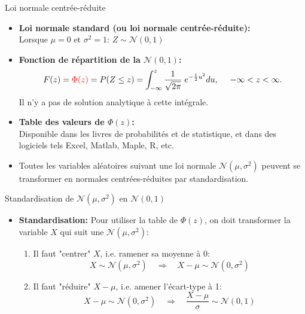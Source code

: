 \documentclass{BeamerTemplate}
\begin{document}
\begin{frame}[t]{Loi normale centrée-réduite}
\small
\begin{itemize}\itemsep5mm
\item {\bf Loi normale standard (ou loi normale centrée-réduite):}\\ Lorsque $\mu=0$ et $\sigma^2=1$:  \alert{$Z\sim \mathcal{N}(0,1)$}
\item {\bf Fonction de répartition de la $\mathcal{N}(0,1)$:}
$$F(z)={\color{red}{\Phi(z)}}=P(Z\leq z)%
=\int_{-\infty}^z\frac{1}{\sqrt{2\pi}}\;e^{-\frac{1}{2}u^2}du,\quad\ -\infty<z<\infty.$$
Il n'y a pas de solution analytique à cette intégrale.

\item{\bf Table des valeurs de $\Phi(z)$:}  \\
Disponible dans les livres de probabilités et de statistique, et dans des logiciels tels Excel, Matlab, Maple, R, etc.
\item Toutes les variables aléatoires suivant une loi normale $\mathcal{N}(\mu,\sigma^2)$ peuvent se transformer en normales centrées-réduites par standardisation.  \\

\end{itemize}
\end{frame}

\begin{frame}[t]{Standardisation de $\mathcal{N}(\mu, \sigma^2)$ en $\mathcal{N}(0,1)$}
\begin{itemize}
\item {\bf Standardisation:} Pour utiliser la table de $\Phi(z)$, on doit transformer la variable $X$ qui suit une $\mathcal{N}(\mu,\sigma^2)$:

\bigskip
    \begin{enumerate}
    \item Il faut  "centrer" $X$, i.e. ramener sa moyenne à 0:
    $$X\sim \mathcal{N}(\mu,\sigma^2)\quad\Rightarrow\quad X-\mu\sim \mathcal{N}(0,\sigma^2)$$
    \item Il faut "réduire" $X-\mu$, i.e. amener l'écart-type à 1:
    $$X-\mu\sim \mathcal{N}(0,\sigma^2)\quad\Rightarrow\quad \frac{X-\mu}{\sigma}\sim \mathcal{N}(0,1)$$
    \end{enumerate}
\end{itemize}
  \end{frame}
\end{document}
